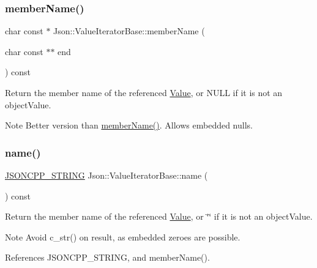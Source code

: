 \subsubsection{\texorpdfstring{member\+Name()}{memberName()}\hspace{0.1cm}{\footnotesize\ttfamily [2/2]}}
{\footnotesize\ttfamily char const  $\ast$ Json\+::\+Value\+Iterator\+Base\+::member\+Name (\begin{DoxyParamCaption}\item[{char const $\ast$$\ast$}]{end }\end{DoxyParamCaption}) const}

Return the member name of the referenced \hyperlink{classJson_1_1Value}{Value}, or N\+U\+LL if it is not an object\+Value. \begin{DoxyNote}{Note}
Better version than \hyperlink{classJson_1_1ValueIteratorBase_a54765da6759fd3f1edcbfbaf308ec263_a54765da6759fd3f1edcbfbaf308ec263}{member\+Name()}. Allows embedded nulls. 
\end{DoxyNote}
\mbox{\label{classJson_1_1ValueIteratorBase_a522989403c976fdbb94da846b99418db_a522989403c976fdbb94da846b99418db}} 
\subsubsection{\texorpdfstring{name()}{name()}}
{\footnotesize\ttfamily \hyperlink{json_8h_a1e723f95759de062585bc4a8fd3fa4be_a1e723f95759de062585bc4a8fd3fa4be}{J\+S\+O\+N\+C\+P\+P\+\_\+\+S\+T\+R\+I\+NG} Json\+::\+Value\+Iterator\+Base\+::name (\begin{DoxyParamCaption}{ }\end{DoxyParamCaption}) const}

Return the member name of the referenced \hyperlink{classJson_1_1Value}{Value}, or \char`\"{}\char`\"{} if it is not an object\+Value. \begin{DoxyNote}{Note}
Avoid {\ttfamily c\+\_\+str()} on result, as embedded zeroes are possible. 
\end{DoxyNote}


References J\+S\+O\+N\+C\+P\+P\+\_\+\+S\+T\+R\+I\+NG, and member\+Name().

\mbox{\label{classJson_1_1ValueIteratorBase_aa83bdcc8114b7d040eb8eb42eeed5f4a_aa83bdcc8114b7d040eb8eb42eeed5f4a}} 
